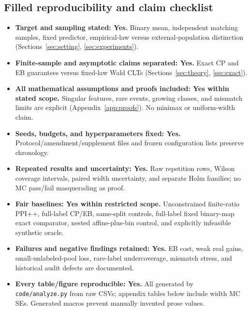 \documentclass{article}
\begin{document}
\begin{table}[h]
\caption{Rare outcomes ($n=200,N=2000$, 20,000 repetitions) and the intentionally invalid shift condition ($n=1000,N=10000$, 3,000 repetitions). Matching marginals fail under shift; no PPI-based validity claim applies there. Near-zero width for Series4 under shift mainly reflects empty support intersections.}
\label{tab:safety}
\centering\small
\end{table}

\subsection{Filled reproducibility and claim checklist}
\begin{itemize}
\item \textbf{Target and sampling stated: Yes.} Binary mean, independent matching samples, fixed predictor, empirical-law versus external-population distinction (Sections~\ref{sec:setting}, \ref{sec:experiments}).
\item \textbf{Finite-sample and asymptotic claims separated: Yes.} Exact CP and EB guarantees versus fixed-law Wald CLTs (Sections~\ref{sec:theory}, \ref{sec:exact}).
\item \textbf{All mathematical assumptions and proofs included: Yes within stated scope.} Singular features, rare events, growing classes, and mismatch limits are explicit (Appendix~\ref{app:proofs}). No minimax or uniform-width claim.
\item \textbf{Seeds, budgets, and hyperparameters fixed: Yes.} Protocol/amendment/supplement files and frozen configuration lists preserve chronology.
\item \textbf{Repeated results and uncertainty: Yes.} Raw repetition rows, Wilson coverage intervals, paired width uncertainty, and separate Holm families; no MC pass/fail masquerading as proof.
\item \textbf{Fair baselines: Yes within restricted scope.} Unconstrained finite-ratio PPI++, full-label CP/EB, same-split controls, full-label fixed binary-map exact comparator, nested affine-plus-bin control, and explicitly infeasible synthetic oracle.
\item \textbf{Failures and negative findings retained: Yes.} EB cost, weak real gains, small-unlabeled-pool loss, rare-label undercoverage, mismatch stress, and historical audit defects are documented.
\item \textbf{Every table/figure reproducible: Yes.} All generated by \texttt{code/analyze.py} from raw CSVs; appendix tables below include width MC SEs. Generated macros prevent manually invented prose values.

\end{itemize}
\end{document}

